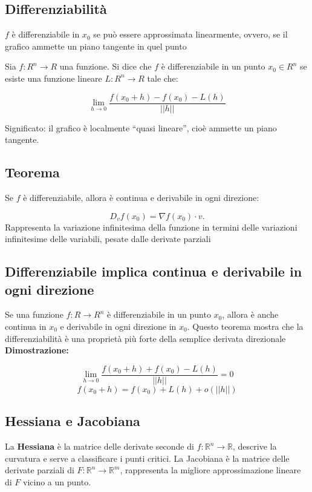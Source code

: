 \documentclass[a4paper,12pt]{article}
\begin{document}
\subsection{Differenziabilità}
$f$ è differenziabile in $x_0$ se può essere approssimata linearmente, ovvero, se il grafico ammette un piano tangente in quel punto 

Sia $f: R^n \to R$ una funzione. Si dice che $f$ è differenziabile in un punto $x_0 \in R^n $ se esiste una funzione lineare $L: R^n \to R$ tale che:

\[
\lim_{h \to 0} \frac{f(x_0 +h) -f(x_0) -L(h)}{||h||}
\]


Significato: il grafico è localmente “quasi lineare”, cioè ammette un piano tangente.

\subsection{Teorema}
Se $f$ è differenziabile, allora è continua e derivabile in ogni direzione:


\[
D_v f(x_0)=\nabla f(x_0)\cdot v.
\]
Rappresenta la variazione infinitesima della funzione in termini delle variazioni infinitesime delle variabili, pesate dalle derivate parziali 

\subsection{Differenziabile implica continua e derivabile in ogni direzione}
Se una funzione $f: R \to R^n$ è differenziabile in un punto $x_0$, allora è anche continua in $x_0$ e derivabile in ogni direzione in $x_0$. Questo teorema mostra che la differenziabilità è una proprietà più forte della semplice derivata direzionale
\textbf{Dimostrazione: }

\[\lim_{h \to 0} \frac{f(x_0 +h) +f(x_0) -L(h)}{||h||} = 0\]
\[f(x_0 +h) = f(x_0)+L(h)+o(||h||) \]

\subsection{Hessiana e Jacobiana}
La \textbf{Hessiana} è la matrice delle derivate seconde di $f:\mathbb{R}^n\to\mathbb{R}$, descrive la curvatura e serve a classificare i punti critici.  
La Jacobiana è la matrice delle derivate parziali di $F:\mathbb{R}^n\to\mathbb{R}^m$, rappresenta la migliore approssimazione lineare di $F$ vicino a un punto.

\end{document}
